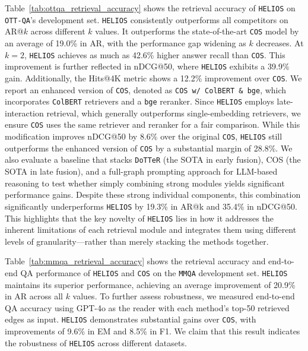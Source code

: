 Table~\ref{tab:ottqa_retrieval_accuracy} shows the retrieval accuracy of \texttt{HELIOS} on \texttt{OTT-QA}'s development set.
\texttt{HELIOS} consistently outperforms all competitors on AR@$k$ across different $k$ values.
It outperforms the state-of-the-art \texttt{COS} model by an average of 19.0\% in AR, with the performance gap widening as $k$ decreases. 
At $k=2$, \texttt{HELIOS} achieves as much as 42.6\% higher answer recall than \texttt{COS}. 
This improvement is further reflected in nDCG@50, where \texttt{HELIOS} exhibits a 39.9\% gain.
Additionally, the Hits@4K metric shows a 12.2\% improvement over \texttt{COS}.
We report an enhanced version of \texttt{COS}, denoted as \texttt{COS w/ ColBERT \& bge}, which incorporates \texttt{ColBERT} retrievers and a \texttt{bge} reranker. 
Since \texttt{HELIOS} employs late-interaction retrieval, which generally outperforms single-embedding retrievers, we ensure \texttt{COS} uses the same retriever and reranker for a fair comparison. 
While this modification improves nDCG@50 by 8.6\% over the original \texttt{COS}, \texttt{HELIOS} still outperforms the enhanced version of \texttt{COS} by a substantial margin of 28.8\%.
{\feditcolor
We also evaluate a baseline that stacks \texttt{DoTTeR} (the SOTA in early fusion), COS (the SOTA in late fusion), and a full-graph prompting approach for LLM-based reasoning to test whether simply combining strong modules yields significant performance gains.
Despite these strong individual components, this combination significantly underperforms \texttt{HELIOS} by 19.3\% in AR@k and 35.4\% in nDCG@50. 
This highlights that the key novelty of \texttt{HELIOS} lies in how it addresses the inherent limitations of each retrieval module and integrates them using different levels of granularity—rather than merely stacking the methods together.
}



{\feditcolor
Table~\ref{tab:mmqa_retrieval_accuracy} shows the retrieval accuracy and end-to-end QA performance of \texttt{HELIOS} and \texttt{COS} on the \texttt{MMQA} development set.
\texttt{HELIOS} maintains its superior performance, achieving an average improvement of 20.9\% in AR across all $k$ values.
To further assess robustness, we measured end-to-end QA accuracy using GPT-4o as the reader with each method’s top-50 retrieved edges as input. 
\texttt{HELIOS} demonstrates substantial gains over \texttt{COS}, with improvements of 9.6\% in EM and 8.5\% in F1.
We claim that this result indicates the robustness of \texttt{HELIOS} across different datasets.
}

